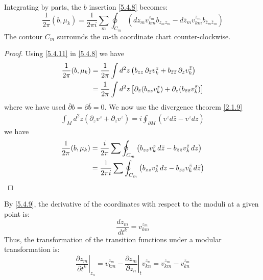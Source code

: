 Integrating by parts, the $b$ insertion \eqref{5.4.8} becomes:
\begin{equation}
	\frac{1}{2 \pi}\left(b, \mu_{k}\right)=\frac{1}{2 \pi i} \sum_{m} \oint_{C_{m}}\left(d z_{m} v_{k m}^{z_{m}} b_{z_{m} z_{m}}-d \bar{z}_{m} v_{k m}^{\bar{z}_{m}} b_{\bar{z}_{m} \bar{z}_{m}}\right)\label{5.4.12}
\end{equation}
The contour $C_{m}$ surrounds the $m$-th coordinate chart counter-clockwise. 
\begin{tcolorbox}[breakable]
	\begin{proof}
	Using \eqref{5.4.11} in \eqref{5.4.8} we have
	\begin{align}
		\frac{1}{2\pi}(b,\mu_k)
		&= \frac{1}{2\pi} \int d^2 z \left( b_{zz}\,\partial_{\bar z} v_k^z + b_{\bar z \bar z}\,\partial_z v_k^{\bar z} \right) \notag \\
		&= \frac{1}{2\pi} \int d^2 z \left[ \partial_{\bar z}(b_{zz} v_k^z) + \partial_z (b_{\bar z \bar z} v_k^{\bar z}) \right]
	\end{align}
	where we have used $\bar\partial b = \partial \bar b = 0$. We now use the divergence theorem \eqref{2.1.9}
	\begin{align}
		\int_M d^2 z \left( \partial_z v^z + \partial_{\bar z} v^{\bar z} \right)
		= i \oint_{\partial M} \left( v^z d\bar z - v^{\bar z} dz \right)
	\end{align}
	we have
	\begin{align}
		\frac{1}{2\pi}(b,\mu_k)
		&= \frac{i}{2\pi} \sum \oint_{C_m} \left( b_{zz} v_k^z\, d\bar z - b_{\bar z \bar z} v_k^{\bar z}\, dz \right) \notag \\
		&= \frac{1}{2\pi i} \sum \oint_{C_m} \left( b_{zz} v_k^z\, dz - b_{\bar z \bar z} v_k^{\bar z}\, d\bar z \right)
	\end{align}
\end{proof}
\end{tcolorbox}
By \eqref{5.4.9}, the derivative of the coordinates with respect to the moduli at a given point is:
\begin{equation}
	\frac{d z_{m}}{d t^{k}}=v_{k m}^{z_{m}}\label{5.4.13}
\end{equation}
Thus, the transformation of the transition functions under a modular transformation is:
\begin{equation}
	\left.\frac{\partial z_{m}}{\partial t^{k}}\right|_{z_{n}}=v_{k m}^{z_{m}}-\left.\frac{\partial z_{m}}{\partial z_{n}}\right|_{t} v_{k n}^{z_{n}}=v_{k m}^{z_{m}}-v_{k n}^{z_{m}}\label{5.4.14}
\end{equation}
